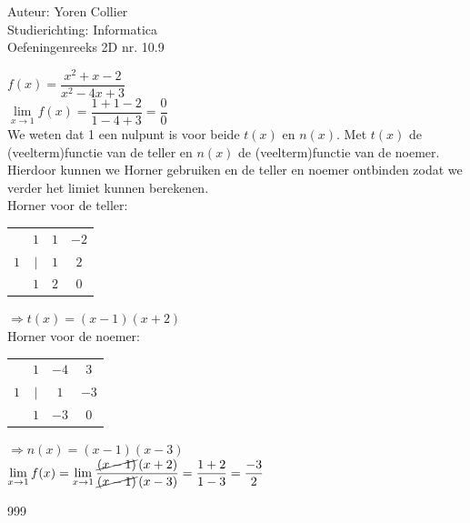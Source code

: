\documentclass[a4paper]{article}
\newcommand{\adR}{\Rightarrow} %
\newcommand{\Lh}{\left(} %
\newcommand{\Rh}{\right)}
\newcommand{\pnR}{\rightarrow} %
\newcommand{\limiet}{\lim\limits_}
\newcommand{\schrap}{\cancel}
\begin{document}
\noindent \large Auteur: Yoren Collier \\
\noindent \large Studierichting: Informatica\\
\noindent \large Oefeningenreeks 2D nr. 10.9\\

\medskip

\normalsize

$f(x) = \dfrac{x^2 +x -2}{x^2 -4x +3}$\\

$\limiet{x \pnR 1} f(x) = \dfrac{1+1-2}{1-4+3} = \dfrac{0}{0}$\\

We weten dat 1 een nulpunt is voor beide $t(x)$ en $n(x)$. Met $t(x)$ de (veelterm)functie van de teller en $n(x)$ de (veelterm)functie van de noemer. Hierdoor kunnen we Horner gebruiken en de teller en noemer ontbinden zodat we verder het limiet kunnen berekenen. \\

Horner voor de teller:\\

\begin{tabular}{c|ccc}
     &  $1$  &  $1$  &  $-2$  \\
  $1$&  $|$  &  $1$  &   $2$  \\
     &  $1$  &  $2$  &   $0$  
\end{tabular}

$\adR t(x) = (x-1)(x+2)$\\

Horner voor de noemer:\\

\begin{tabular}{c|ccc}
     &  $1$  &  $-4$  &  $3$  \\
  $1$&  $|$  &  $1$   &  $-3$  \\
     &  $1$  &  $-3$  &  $0$  
\end{tabular}

$\adR n(x) = (x-1)(x-3)$\\

$\limiet{x \pnR 1} f(x) = \limiet{x \pnR 1} \dfrac{\schrap{\Lh x-1 \Rh} \Lh x+2 \Rh }{\schrap{\Lh x-1 \Rh} \Lh x-3 \Rh } = \dfrac{1+2}{1-3} = \dfrac{-3}{2}$\\

\begin{thebibliography}{999}
\end{thebibliography}
\end{document}
